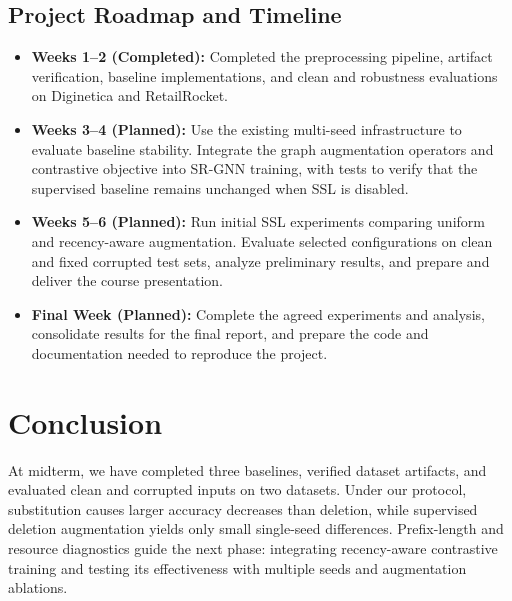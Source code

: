 \documentclass[11pt]{article}
\begin{document}
\subsection{Project Roadmap and Timeline}
\begin{itemize}[leftmargin=*]
  \item \textbf{Weeks 1--2 (Completed):} Completed the preprocessing pipeline, artifact verification, baseline implementations, and clean and robustness evaluations on Diginetica and RetailRocket.
  \item \textbf{Weeks 3--4 (Planned):} Use the existing multi-seed infrastructure to evaluate baseline stability. Integrate the graph augmentation operators and contrastive objective into SR-GNN training, with tests to verify that the supervised baseline remains unchanged when SSL is disabled.
  \item \textbf{Weeks 5--6 (Planned):} Run initial SSL experiments comparing uniform and recency-aware augmentation. Evaluate selected configurations on clean and fixed corrupted test sets, analyze preliminary results, and prepare and deliver the course presentation.
  \item \textbf{Final Week (Planned):} Complete the agreed experiments and analysis, consolidate results for the final report, and prepare the code and documentation needed to reproduce the project.
\end{itemize}

\section{Conclusion}\label{sec:conclusion}
At midterm, we have completed three baselines, verified dataset artifacts, and evaluated clean and corrupted inputs on two datasets. Under our protocol, substitution causes larger accuracy decreases than deletion, while supervised deletion augmentation yields only small single-seed differences. Prefix-length and resource diagnostics guide the next phase: integrating recency-aware contrastive training and testing its effectiveness with multiple seeds and augmentation ablations.


\end{document}
